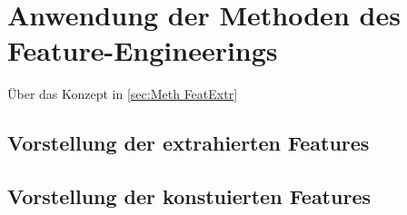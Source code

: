 \section{Anwendung der Methoden des Feature-Engineerings}
Über das Konzept in \ref{sec:Meth FeatExtr}


\subsection{Vorstellung der extrahierten Features}

\subsection{Vorstellung der konstuierten Features}